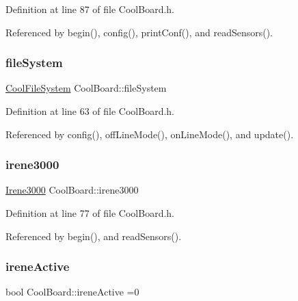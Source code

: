 Definition at line 87 of file Cool\+Board.\+h.



Referenced by begin(), config(), print\+Conf(), and read\+Sensors().

\mbox{\label{classCoolBoard_a42c2586fbb13ff7f06538e9284e8538d}} 
\subsubsection{\texorpdfstring{file\+System}{fileSystem}}
{\footnotesize\ttfamily \hyperlink{classCoolFileSystem}{Cool\+File\+System} Cool\+Board\+::file\+System\hspace{0.3cm}{\ttfamily [private]}}



Definition at line 63 of file Cool\+Board.\+h.



Referenced by config(), off\+Line\+Mode(), on\+Line\+Mode(), and update().

\mbox{\label{classCoolBoard_ad103718ce316006c4695b8eb312eaf11}} 
\subsubsection{\texorpdfstring{irene3000}{irene3000}}
{\footnotesize\ttfamily \hyperlink{classIrene3000}{Irene3000} Cool\+Board\+::irene3000\hspace{0.3cm}{\ttfamily [private]}}



Definition at line 77 of file Cool\+Board.\+h.



Referenced by begin(), and read\+Sensors().

\mbox{\label{classCoolBoard_a9c3f7ac625481ee2ae802a25d97a4ae0}} 
\subsubsection{\texorpdfstring{irene\+Active}{ireneActive}}
{\footnotesize\ttfamily bool Cool\+Board\+::irene\+Active =0\hspace{0.3cm}{\ttfamily [private]}}



